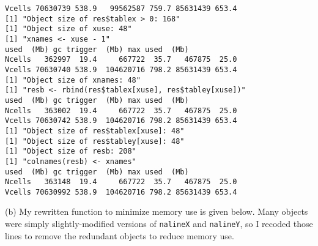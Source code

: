 \documentclass{article}\usepackage[]{graphicx}\usepackage[]{color}
\begin{document}
\begin{verbatim}
Vcells 70630739 538.9   99562587 759.7 85631439 653.4
[1] "Object size of res$tablex > 0: 168"
[1] "Object size of xuse: 48"
[1] "xnames <- xuse - 1"
used  (Mb) gc trigger  (Mb) max used  (Mb)
Ncells   362997  19.4     667722  35.7   467875  25.0
Vcells 70630740 538.9  104620716 798.2 85631439 653.4
[1] "Object size of xnames: 48"
[1] "resb <- rbind(res$tablex[xuse], res$tabley[xuse])"
used  (Mb) gc trigger  (Mb) max used  (Mb)
Ncells   363002  19.4     667722  35.7   467875  25.0
Vcells 70630742 538.9  104620716 798.2 85631439 653.4
[1] "Object size of res$tablex[xuse]: 48"
[1] "Object size of res$tabley[xuse]: 48"
[1] "Object size of resb: 208"
[1] "colnames(resb) <- xnames"
used  (Mb) gc trigger  (Mb) max used  (Mb)
Ncells   363148  19.4     667722  35.7   467875  25.0
Vcells 70630992 538.9  104620716 798.2 85631439 653.4
\end{verbatim}

(b) My rewritten function to minimize memory use is given below. Many objects were simply slightly-modified versions of \texttt{nalineX} and \texttt{nalineY}, so I recoded those lines to remove the redundant objects to reduce memory use.
  
\end{document}
